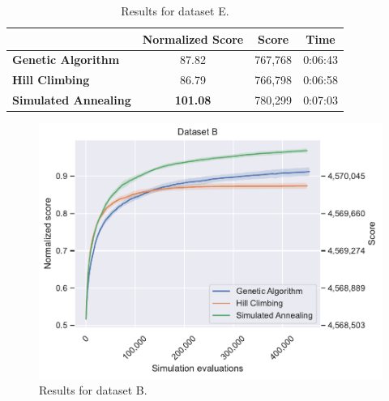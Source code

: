 \begin{table}[h]
\centering\footnotesize\sf
\begin{tabular}{lccc}
\toprule
& Normalized Score & Score & Time \\
\midrule
\textcolor{myblue}{\textbf{Genetic Algorithm}} & 87.82 & 767,768 & 0:06:43 \\
\textcolor{myorange}{\textbf{Hill Climbing}} & 86.79 & 766,798 & 0:06:58 \\
\textcolor{mygreen}{\textbf{Simulated Annealing}} & \textbf{101.08} & 780,299 & 0:07:03 \\
\bottomrule
\end{tabular}
\caption[Results for dataset E]{Results for dataset E.}
\label{tab:dataset_e_results}
\end{table}

\newpage

\begin{figure}[h]
    \centering
    \includegraphics[width=\linewidth]{img/experiments/b_Genetic Algorithm_Hill Climbing_Simulated Annealing.pdf}
    \caption[Results for dataset B]{
        Results for dataset B.
    }
    \label{fig:dataset_b_experiment}
\end{figure}

